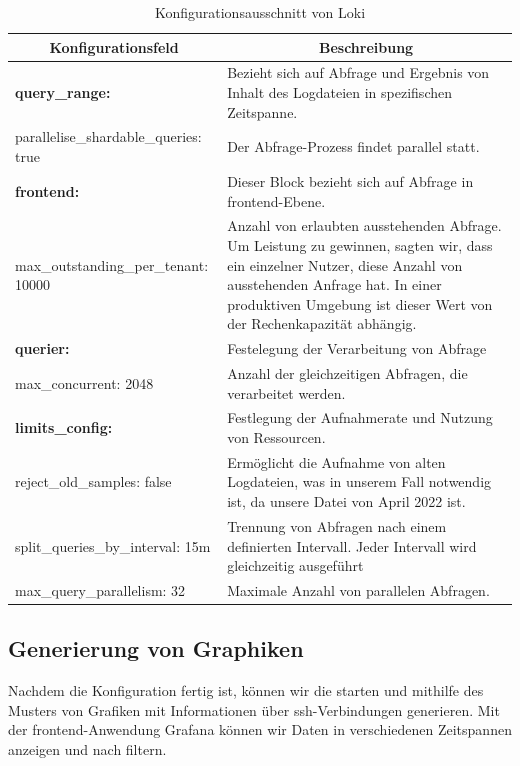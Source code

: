 \begin{table}[H]
  \begin{tabularx}{\textwidth}{|m{6cm}|X|}
  \hline
  \multicolumn{1}{|c|}{\textbf{Konfigurationsfeld}} & \multicolumn{1}{|c|}{\textbf{Beschreibung}} \\
  \hline
  \textbf{query\_range:} & Bezieht sich auf Abfrage und Ergebnis von Inhalt des Logdateien in spezifischen Zeitspanne. \\
  \hphantom{te}parallelise\_shardable\_queries: true & Der Abfrage-Prozess findet parallel statt.\\ \hline

  \textbf{frontend:} & Dieser Block bezieht sich auf Abfrage in \gls{frontend}-Ebene. \\
  \hphantom{te}max\_outstanding\_per\_tenant: 10000 & Anzahl von erlaubten  ausstehenden Abfrage. Um Leistung zu gewinnen, sagten wir, dass ein einzelner Nutzer, diese Anzahl von ausstehenden Anfrage hat. In einer produktiven Umgebung ist dieser Wert von der Rechenkapazität abhängig.\\ \hline

  \textbf{querier:} & Festelegung der Verarbeitung von Abfrage \\ 
  \hphantom{te}max\_concurrent: 2048 & Anzahl der gleichzeitigen Abfragen, die verarbeitet werden. \\ \hline

  \textbf{limits\_config:} & Festlegung der Aufnahmerate und Nutzung von Ressourcen. \\ 
  \hphantom{te}reject\_old\_samples: false & Ermöglicht die Aufnahme von alten Logdateien, was in unserem Fall notwendig ist, da unsere Datei von April 2022 ist. \\ 
  \hphantom{te}split\_queries\_by\_interval: 15m & Trennung von Abfragen nach einem definierten Intervall. Jeder Intervall wird gleichzeitig ausgeführt \\ 
  \hphantom{te}max\_query\_parallelism: 32 & Maximale Anzahl von parallelen Abfragen.  \\ \hline

  \end{tabularx}
  \caption[Konfigurationsausschnitt von Loki]
  {Konfigurationsausschnitt von Loki}
  \label{tab:KonfigLoki}
\end{table}

\newpage
\subsection{Generierung von Graphiken}
Nachdem die Konfiguration fertig ist, können wir die  starten und mithilfe des Musters von \cite{VoidQuark_sshlogs} Grafiken mit Informationen über \gls{ssh}-Verbindungen generieren. Mit der \gls{frontend}-Anwendung Grafana können wir Daten in verschiedenen Zeitspannen anzeigen und nach  filtern. 

